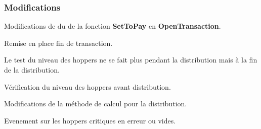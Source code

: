 \subsubsection*{Modifications}


\begin{DoxyItemize}
\item Modifications de du de la fonction {\bfseries Set\+To\+Pay} en {\bfseries Open\+Transaction}.
\item Remise en place fin de transaction.
\item Le test du niveau des hoppers ne se fait plus pendant la distribution mais à la fin de la distribution.
\item Vérification du niveau des hoppers avant distribution.
\item Modifications de la méthode de calcul pour la distribution.
\item Evenement sur les hoppers critiques en erreur ou vides. 
\end{DoxyItemize}